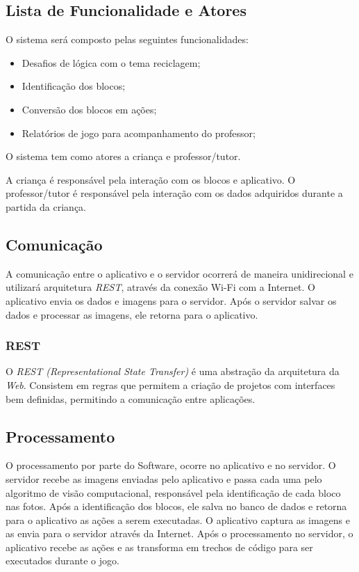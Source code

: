     \subsection{Lista de Funcionalidade e Atores}
    O sistema será composto  pelas seguintes funcionalidades:
    \begin{itemize}
        \item Desafios de lógica com o tema reciclagem;
        \item Identificação dos blocos;
        \item Conversão dos blocos em ações;
        \item Relatórios de jogo para acompanhamento do professor;
    \end{itemize}
    
    O sistema tem como atores a criança e professor/tutor.
    
    A criança é responsável pela interação com os blocos e aplicativo.
    O professor/tutor é responsável pela interação com os dados adquiridos durante a partida da criança.
    
    \subsection{Comunicação}
    A comunicação entre o aplicativo e o servidor ocorrerá de maneira unidirecional e utilizará arquitetura \textit{REST}, através da conexão Wi-Fi com a Internet.
    O aplicativo envia os dados e imagens para o servidor. Após o servidor salvar os dados e processar as imagens, ele retorna para o aplicativo.
    
        \subsubsection{REST}
        O \textit{REST (Representational State Transfer)} é uma abstração da arquitetura da \textit{Web}. Consistem em regras que permitem a criação de projetos com interfaces bem definidas, permitindo a comunicação entre aplicações.
    
    
    \subsection{Processamento}
    O processamento por parte do Software, ocorre no aplicativo e no servidor.
    O servidor recebe as imagens enviadas pelo aplicativo e passa cada uma pelo algoritmo de visão computacional, responsável pela identificação de cada bloco nas fotos. Após a identificação dos blocos, ele salva no banco de dados e retorna para o aplicativo as ações a serem executadas.
    O aplicativo captura as imagens e as envia para o servidor através da Internet. Após o processamento no servidor, o aplicativo recebe as ações e as transforma em trechos de código para ser executados durante o jogo.
    
